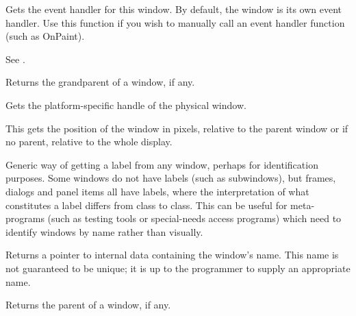 \label{wxwindowgeteventhandler}


Gets the event handler for this window. By default, the window is its
own event handler. Use this function if you wish to manually call an event handler
function (such as OnPaint).

See .



Returns the grandparent of a window, if any.



Gets the platform-specific handle of the physical window.



This gets the position of the window in pixels, relative to the parent window or
if no parent, relative to the whole display.



Generic way of getting a label from any window, perhaps for
identification purposes. Some windows do not have labels (such as
subwindows), but frames, dialogs and panel items all have labels,
where the interpretation of what constitutes a label differs from
class to class. This can be useful for meta-programs (such as testing
tools or special-needs access programs) which need to identify windows
by name rather than visually.

\label{wxwindowgetname}


Returns a pointer to internal data containing the window's name. This name is not guaranteed
to be unique; it is up to the programmer to supply an appropriate name.



Returns the parent of a window, if any.


